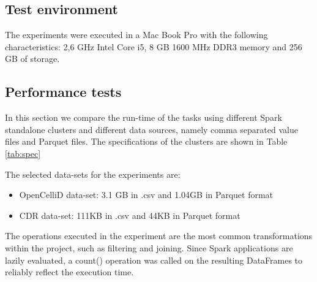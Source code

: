 \subsection{Test environment}
The experiments were executed in a Mac Book Pro with the following characteristics: 2,6 GHz Intel Core i5, 8 GB 1600 MHz DDR3 memory and 256 GB of storage.

\subsection{Performance tests}
In this section we compare the run-time of the tasks using different Spark standalone clusters and different data sources, namely comma separated value files and Parquet files. The specifications of the clusters are shown in Table \ref{tab:spec}

The selected data-sets for the experiments are:
\begin{itemize}
    \item OpenCelliD data-set: 3.1 GB in .csv  and 1.04GB in Parquet format
    \item CDR data-set: 111KB in .csv and 44KB in Parquet format
\end{itemize}

The operations executed in the experiment are the most common transformations within the project, such as filtering and joining. Since Spark applications are lazily evaluated, a count() operation was called on the resulting DataFrames to reliably reflect the execution time.

\begin{table}[h]
    \centering
    \caption{Specifications of test clusters}
    \label{tab:spec}
\end{table}

